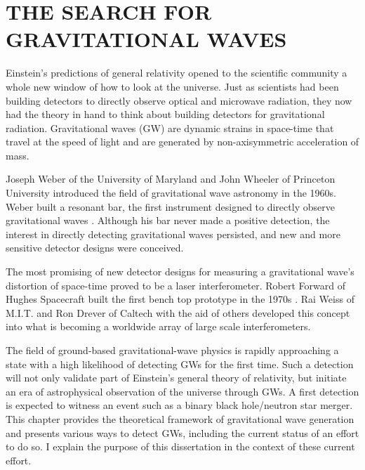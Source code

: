 \chapter{THE SEARCH FOR GRAVITATIONAL WAVES}


Einstein's predictions of general relativity opened to the scientific
community a whole new window of how to look at the universe. Just as
scientists had been building detectors to directly observe optical and
microwave radiation, they now had the theory in hand to think about
building detectors for gravitational radiation. Gravitational waves
(GW) are dynamic strains in space-time that travel at the speed of
light and are generated by non-axisymmetric acceleration of mass.

Joseph Weber of the University of Maryland and John Wheeler of
Princeton University introduced the field of gravitational wave
astronomy in the 1960s. Weber built a resonant bar, the first
instrument designed to directly observe gravitational waves
\cite{Weber1960Detection}. Although his bar never made a positive
detection, the interest in directly detecting gravitational waves
persisted, and new and more sensitive detector designs were conceived.

The most promising of new detector designs for measuring a
gravitational wave's distortion of space-time proved to be a laser
interferometer. Robert Forward of Hughes Spacecraft built the first
bench top prototype in the 1970s \cite{Forward1978Wideband}. Rai Weiss
of M.I.T. and Ron Drever of Caltech with the aid of others developed
this concept into what is becoming a worldwide array of large scale
interferometers.

The field of ground-based gravitational-wave physics is rapidly
approaching a state with a high likelihood of detecting GWs for the
first time. Such a detection will not only validate part of Einstein's
general theory of relativity, but initiate an era of astrophysical
observation of the universe through GWs.  A first detection is
expected to witness an event such as a binary black hole/neutron star
merger. This chapter provides the theoretical framework of
gravitational wave generation and presents various ways to detect GWs,
including the current status of an effort to do so. I explain the
purpose of this dissertation in the context of these current effort.


